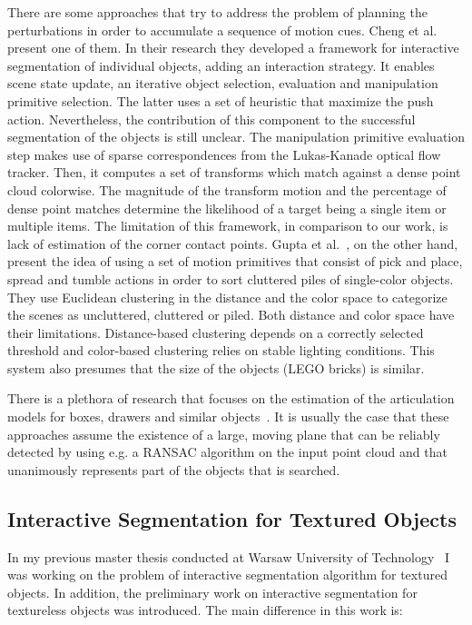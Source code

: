 There are some approaches that try to address the problem of planning the perturbations in order to accumulate a sequence of motion cues. Cheng et al.~\cite{chang11interactive} present one of them. In their research they developed a framework for interactive segmentation of individual objects, adding an interaction strategy. It enables scene state update, an iterative object selection, evaluation and manipulation primitive selection. The latter uses a set of heuristic that maximize the push action. Nevertheless, the contribution of this component to the successful segmentation of the objects is still unclear. The manipulation primitive evaluation step makes use of sparse correspondences from the Lukas-Kanade optical flow tracker. Then, it computes a set of transforms which match against a dense point cloud colorwise. The magnitude of the transform motion and the percentage of dense point matches determine the likelihood of a target being a single item or multiple items. The limitation of this framework, in comparison to our work, is lack of estimation of the corner contact points.
Gupta et al.~\cite{gupta11primitives}, on the other hand, present the idea of using a set of motion primitives that consist of pick and place, spread and tumble actions in order to sort cluttered piles of single-color objects. They use Euclidean clustering in the distance and the color space to categorize the scenes as uncluttered, cluttered or piled. Both distance and color space have their limitations. Distance-based clustering depends on a correctly selected threshold and color-based clustering relies on stable lighting conditions. This system also presumes that the size of the objects (LEGO bricks) is similar. 

There is a plethora of research that focuses on the estimation of the articulation models for boxes, drawers and similar objects~\cite{Box11Saxena,
  sturm10rss-workshop}. It is usually the case that these approaches assume the existence of a large, moving plane that can be reliably detected by using e.g. a RANSAC algorithm on the input point cloud and that  unanimously represents part of the objects that is searched.


\subsection{Interactive Segmentation for Textured Objects}
In my previous master thesis conducted at Warsaw University of Technology~\cite{polishthesis} I was working on the problem of interactive segmentation algorithm for textured objects. In addition, the preliminary work on interactive segmentation for textureless objects was introduced. The main difference in this work is: 

